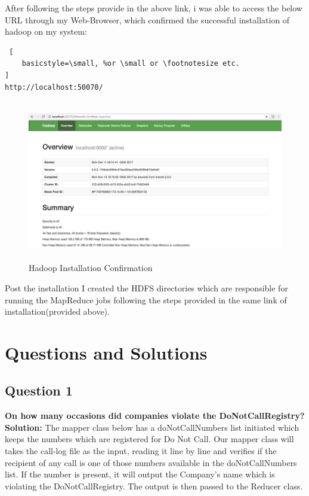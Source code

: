\documentclass[a4paper, 10pt]{article}
\begin{document}
After following the steps provide in the above link, i was able to access the below URL through my Web-Browser, which confirmed the successful installation of hadoop on my system:
\begin{lstlisting} [
    basicstyle=\small, %or \small or \footnotesize etc.
]
http://localhost:50070/
\end{lstlisting}

\begin{figure}[!htbp]
    \centering
    \includegraphics[height=7cm]{InstallationConfirmation.png}
    \caption{Hadoop Installation Confirmation}
\end{figure}
\newpage

Post the installation I created the HDFS directories which are responsible for running the MapReduce jobs following the steps provided in the same link of installation(provided above).

\section{Questions and Solutions}
\subsection{Question 1}
\textbf{On how many occasions did companies violate the DoNotCallRegistry?}\\
\noindent
\textbf{Solution:}
The mapper class below has a doNotCallNumbers list initiated which keeps the numbers which are registered for Do Not Call. Our mapper class will takes the call-log file as the input, reading it line by line and verifies if the recipient of any call is one of those numbers available in the doNotCallNumbers list. If the number is present, it will output the Company's name which is violating the DoNotCallRegistry.
The output is then passed to the Reducer class.
\end{document}
